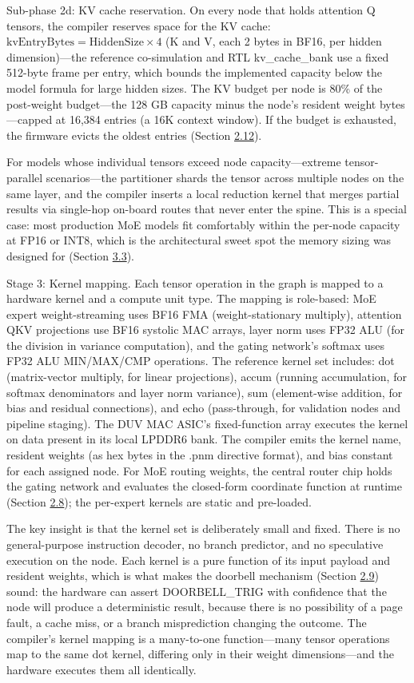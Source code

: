 \documentclass[10pt,twocolumn]{article}
\begin{document}
Sub-phase 2d: KV cache reservation. On every node that holds attention Q tensors, the compiler reserves space for the KV cache: $\mathrm{kvEntryBytes} = \mathrm{HiddenSize} \times 4$ (K and V, each 2 bytes in BF16, per hidden dimension)---the reference co-simulation and RTL kv\_cache\_bank use a fixed 512-byte frame per entry, which bounds the implemented capacity below the model formula for large hidden sizes. The KV budget per node is 80\% of the post-weight budget---the 128 GB capacity minus the node's resident weight bytes---capped at 16,384 entries (a 16K context window). If the budget is exhausted, the firmware evicts the oldest entries (Section \hyperref[sec:2.12]{2.12}).

For models whose individual tensors exceed node capacity---extreme tensor-parallel scenarios---the partitioner shards the tensor across multiple nodes on the same layer, and the compiler inserts a local reduction kernel that merges partial results via single-hop on-board routes that never enter the spine. This is a special case: most production MoE models fit comfortably within the per-node capacity at FP16 or INT8, which is the architectural sweet spot the memory sizing was designed for (Section \hyperref[sec:3.3]{3.3}).

Stage 3: Kernel mapping. Each tensor operation in the graph is mapped to a hardware kernel and a compute unit type. The mapping is role-based: MoE expert weight-streaming uses BF16 FMA (weight-stationary multiply), attention QKV projections use BF16 systolic MAC arrays, layer norm uses FP32 ALU (for the division in variance computation), and the gating network's softmax uses FP32 ALU MIN/MAX/CMP operations. The reference kernel set includes: dot (matrix-vector multiply, for linear projections), accum (running accumulation, for softmax denominators and layer norm variance), sum (element-wise addition, for bias and residual connections), and echo (pass-through, for validation nodes and pipeline staging). The DUV MAC ASIC's fixed-function array executes the kernel on data present in its local LPDDR6 bank. The compiler emits the kernel name, resident weights (as hex bytes in the .pnm directive format), and bias constant for each assigned node. For MoE routing weights, the central router chip holds the gating network and evaluates the closed-form coordinate function at runtime (Section \hyperref[sec:2.8]{2.8}); the per-expert kernels are static and pre-loaded.

The key insight is that the kernel set is deliberately small and fixed. There is no general-purpose instruction decoder, no branch predictor, and no speculative execution on the node. Each kernel is a pure function of its input payload and resident weights, which is what makes the doorbell mechanism (Section \hyperref[sec:2.9]{2.9}) sound: the hardware can assert DOORBELL\_TRIG with confidence that the node will produce a deterministic result, because there is no possibility of a page fault, a cache miss, or a branch misprediction changing the outcome. The compiler's kernel mapping is a many-to-one function---many tensor operations map to the same dot kernel, differing only in their weight dimensions---and the hardware executes them all identically.
\end{document}
